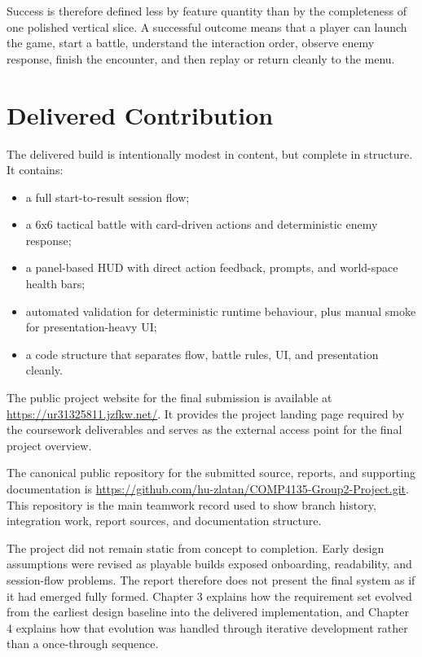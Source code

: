Success is therefore defined less by feature quantity than by the completeness of one polished vertical slice. A successful outcome means that a player can launch the game, start a battle, understand the interaction order, observe enemy response, finish the encounter, and then replay or return cleanly to the menu.

\section{Delivered Contribution}

The delivered build is intentionally modest in content, but complete in structure. It contains:

\begin{itemize}
    \item a full start-to-result session flow;
    \item a 6x6 tactical battle with card-driven actions and deterministic enemy response;
    \item a panel-based HUD with direct action feedback, prompts, and world-space health bars;
    \item automated validation for deterministic runtime behaviour, plus manual smoke for presentation-heavy UI;
    \item a code structure that separates flow, battle rules, UI, and presentation cleanly.
\end{itemize}

The public project website for the final submission is available at \url{https://ur31325811.jzfkw.net/}. It provides the project landing page required by the coursework deliverables and serves as the external access point for the final project overview.

The canonical public repository for the submitted source, reports, and supporting documentation is \url{https://github.com/hu-zlatan/COMP4135-Group2-Project.git}. This repository is the main teamwork record used to show branch history, integration work, report sources, and documentation structure.

The project did not remain static from concept to completion. Early design assumptions were revised as playable builds exposed onboarding, readability, and session-flow problems. The report therefore does not present the final system as if it had emerged fully formed. Chapter 3 explains how the requirement set evolved from the earliest design baseline into the delivered implementation, and Chapter 4 explains how that evolution was handled through iterative development rather than a once-through sequence.
